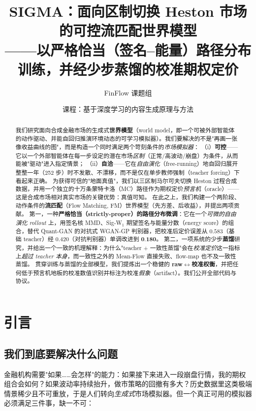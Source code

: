 \documentclass[11pt]{ctexart}
\title{\bfseries SIGMA：面向区制切换 Heston 市场的可控流匹配世界模型\\
——以严格恰当（签名--能量）路径分布训练，并经少步蒸馏的校准期权定价}
\author{FinFlow 课题组}
\date{课程：基于深度学习的内容生成原理与方法}
\newcommand{\best}[1]{\textbf{#1}}
\begin{document}
\maketitle

\begin{abstract}
我们研究面向合成金融市场的生成式\textbf{世界模型}（world model，即一个可被外部智能体的动作驱动、并能自回归推演环境动态的可学习模拟器）。我们要解决的不是"再画一张像收益曲线的图"，而是构造一个同时满足两个苛刻条件的\emph{市场模拟器}：
（i）\textbf{可控}——它以一个外部智能体在每一步设定的潜在市场\emph{区制}（正常/高波动/崩盘）为条件，从而能被"驱动"进入指定情景；
（ii）\textbf{自洽}——它在\emph{自由演化}（free-running）地自回归展开整整一年（252 步）时不发散、不漂移，而不是仅在单步教师强制（teacher forcing）下看起来正确。
为获得可信的"地面真值"，我们以三区制马尔可夫切换 Heston 过程合成数据，并用一个独立的十万条蒙特卡洛（MC）路径作为期权定价\emph{预言机}（oracle）——这是合成市场相对真实市场的关键优势：真值可知。
在此之上，我们构建一个两阶段、动作条件的\textbf{流匹配}（Flow Matching, FM）世界模型（先方差、后收益），并提出两项贡献。
第一，一种\textbf{严格恰当（strictly-proper）的路径分布微调}：它在一个\emph{可微的自由演化 rollout} 上，用签名核 MMD、Sig-W$_1$ 期望签名与能量分数（energy score）的组合，替代 Quant-GAN 的对抗式 WGAN-GP 判别器，把校准后定价误差从 $0.583$（基础 teacher）经 $0.420$（对抗判别器）单调改进到 $\best{0.180}$。
第二，一项系统的少步\textbf{蒸馏}研究，并给出一个一致的机理解释：为什么"teacher + 一致性蒸馏"会在\emph{校准定价}这一指标上\emph{超过 teacher 本身}，而一致性之外的 Mean-Flow 直接失败、flow-map 也不及一致性蒸馏。
贯穿训练与蒸馏的全部模型，我们提炼出一个稳健的 \textbf{raw$\leftrightarrow$校准权衡}，并把任何低于预言机地板的校准数值识别并标注为校准\emph{假象}（artifact）。我们公开全部代码与协议。
\end{abstract}

\section{引言}
\label{sec:intro}

\subsection{我们到底要解决什么问题}
金融机构需要"如果……会怎样"的能力：如果接下来进入一段崩盘行情，我的期权组合会如何？如果波动率持续抬升，做市策略的回撤有多大？历史数据里这类极端情景稀少且不可重放，于是人们转向\emph{生成式}市场模拟器。但一个真正可用的模拟器必须满足三件事，缺一不可：
\end{document}
